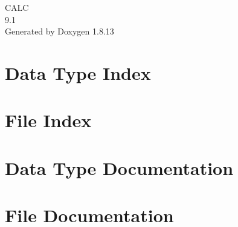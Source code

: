 \documentclass[twoside]{book}
\newcommand{\+}{\discretionary{\mbox{\scriptsize$\hookleftarrow$}}{}{}}
\newcommand{\clearemptydoublepage}{%
  \newpage{\pagestyle{empty}\cleardoublepage}%
}
\begin{document}
\hypersetup{pageanchor=false,
             bookmarksnumbered=true,
             pdfencoding=unicode
            }
\begin{titlepage}
\vspace*{7cm}
\begin{center}%
{\Large C\+A\+LC \\[1ex]\large 9.\+1 }\\
\vspace*{1cm}
{\large Generated by Doxygen 1.8.13}\\
\end{center}
\end{titlepage}
\clearemptydoublepage
{}
\tableofcontents
\clearemptydoublepage
{}
\hypersetup{pageanchor=true}

\chapter{Data Type Index}

\chapter{File Index}

\chapter{Data Type Documentation}







\chapter{File Documentation}

















































\backmatter
\newpage
{}
\clearemptydoublepage
{}
\printindex
\end{document}
